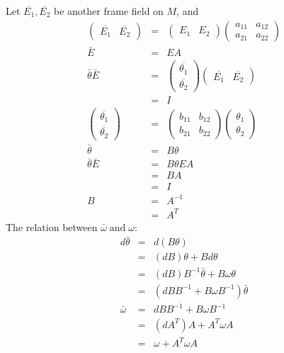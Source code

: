 \documentclass{article}
\newcommand{\tmop}[1]{\ensuremath{\operatorname{#1}}}
\begin{document}
Let $\overline{E_1}, \overline{E_2}$ be another frame field on $M$, and
\begin{eqnarray}
  \left(\begin{array}{cc}
    \overline{E_1} & \overline{E_2}
  \end{array}\right) & = & \left(\begin{array}{cc}
    E_1 & E_2
  \end{array}\right) \left(\begin{array}{cc}
    a_{11} & a_{12}\\
    a_{21} & a_{22}
  \end{array}\right) \nonumber\\
  \bar{E} & = & E A \nonumber\\
  \bar{\theta} \bar{E} & = & \left(\begin{array}{c}
    \overline{\theta_1}\\
    \overline{\theta_2}
  \end{array}\right) \left(\begin{array}{cc}
    \overline{E_1} & \overline{E_2}
  \end{array}\right) \nonumber\\
  & = & I \nonumber\\
  \left(\begin{array}{c}
    \overline{\theta_1}\\
    \overline{\theta_2}
  \end{array}\right) & = & \left(\begin{array}{cc}
    b_{11} & b_{12}\\
    b_{21} & b_{22}
  \end{array}\right) \left(\begin{array}{c}
    \theta_1\\
    \theta_2
  \end{array}\right) \nonumber\\
  \bar{\theta} & = & B \theta \nonumber\\
  \bar{\theta} \bar{E} & = & B \theta E A \nonumber\\
  & = & B A \nonumber\\
  & = & I \nonumber\\
  B & = & A^{- 1} \nonumber\\
  & = & A^T 
\end{eqnarray}
The relation between $\bar{\omega} \tmop{and} \omega$:
\begin{eqnarray}
  d \bar{\theta} & = & d (B \theta) \nonumber\\
  & = & (d B) \theta + B d \theta \nonumber\\
  & = & (d B) B^{- 1} \bar{\theta} + B \omega \theta \nonumber\\
  & = & (d B B^{- 1} + B \omega B^{- 1}) \bar{\theta} \nonumber\\
  \bar{\omega} & = & d B B^{- 1} + B \omega B^{- 1} \nonumber\\
  & = & (d A^T) A + A^T \omega A \nonumber\\
  & = & \omega + A^T \omega A 
\end{eqnarray}
\end{document}
